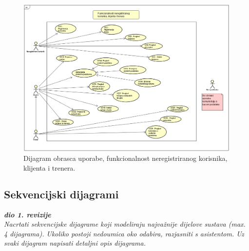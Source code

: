 		\begin{figure}[H]
			\includegraphics[scale=0.8]{slike/UC_client_trainer_unregistered.PNG} %
			\caption{Dijagram obrasca uporabe, funkcionalnost neregistriranog korisnika, klijenta i trenera.}
			\label{fig:UC_klijent_trener_neregistrirani} %
		\end{figure}
		
		
				
			\subsection{Sekvencijski dijagrami}
				
				\textbf{\textit{dio 1. revizije}}\\
				
				\textit{Nacrtati sekvencijske dijagrame koji modeliraju najvažnije dijelove sustava (max. 4 dijagrama). Ukoliko postoji nedoumica oko odabira, razjasniti s asistentom. Uz svaki dijagram napisati detaljni opis dijagrama.}




